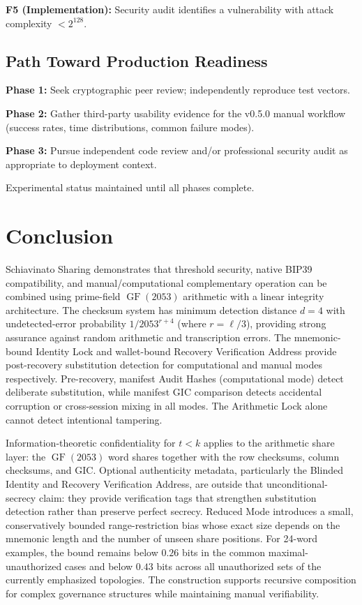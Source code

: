 \documentclass[11pt]{article}
\newcommand{\GF}{\operatorname{GF}}
\begin{document}
\textbf{F5 (Implementation):} Security audit identifies a vulnerability with attack complexity $< 2^{128}$.

\subsection{Path Toward Production Readiness}

\textbf{Phase 1:} Seek cryptographic peer review; independently reproduce test vectors.

\textbf{Phase 2:} Gather third-party usability evidence for the v0.5.0 manual workflow (success rates, time distributions, common failure modes).

\textbf{Phase 3:} Pursue independent code review and/or professional security audit as appropriate to deployment context.

Experimental status maintained until all phases complete.

\section{Conclusion}
\label{sec:conclusion}

Schiavinato Sharing demonstrates that threshold security, native BIP39 compatibility, and manual/computational complementary operation can be combined using prime-field $\GF(2053)$ arithmetic with a linear integrity architecture. The checksum system has minimum detection distance $d = 4$ with undetected-error probability $1/2053^{r+4}$ (where $r = \ell/3$), providing strong assurance against random arithmetic and transcription errors. The mnemonic-bound Identity Lock and wallet-bound Recovery Verification Address provide post-recovery substitution detection for computational and manual modes respectively. Pre-recovery, manifest Audit Hashes (computational mode) detect deliberate substitution, while manifest GIC comparison detects accidental corruption or cross-session mixing in all modes. The Arithmetic Lock alone cannot detect intentional tampering.

Information-theoretic confidentiality for $t < k$ applies to the arithmetic share layer: the $\GF(2053)$ word shares together with the row checksums, column checksums, and GIC. Optional authenticity metadata, particularly the Blinded Identity and Recovery Verification Address, are outside that unconditional-secrecy claim: they provide verification tags that strengthen substitution detection rather than preserve perfect secrecy. Reduced Mode introduces a small, conservatively bounded range-restriction bias whose exact size depends on the mnemonic length and the number of unseen share positions. For 24-word examples, the bound remains below $0.26$ bits in the common maximal-unauthorized cases and below $0.43$ bits across all unauthorized sets of the currently emphasized topologies. The construction supports recursive composition for complex governance structures while maintaining manual verifiability.
\end{document}
